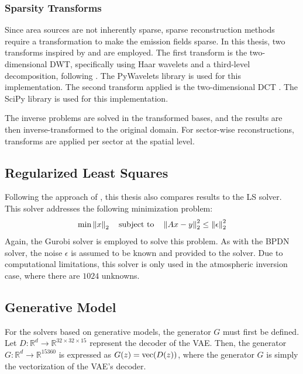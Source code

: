 \subsubsection{Sparsity Transforms}
Since area sources are not inherently sparse, sparse reconstruction methods require a transformation to make the emission fields sparse.
In this thesis, two transforms inspired by \textcite{CSUsingAI} and \textcite{UrbanSparseReconstruction} are employed.
The first transform is the two-dimensional \gls{DWT}, specifically using Haar wavelets \parencite{Wavelets} and a third-level decomposition, following \textcite{UrbanSparseReconstruction}.
The PyWavelets library \parencite{PyWavelets} is used for this implementation.
The second transform applied is the two-dimensional \gls{DCT} \parencite{DCT}.
The SciPy library \parencite{SciPy} is used for this implementation.

The inverse problems are solved in the transformed bases, and the results are then inverse-transformed to the original domain.
For sector-wise reconstructions, transforms are applied per sector at the spatial level.

\subsection{Regularized Least Squares}
Following the approach of \textcite{UrbanSparseReconstruction}, this thesis also compares results to the \gls{LS} solver.
This solver addresses the following minimization problem: 
\begin{equation}
    \min \left\lVert x\right\rVert_2 \quad \text{subject to} \quad  \left\lVert Ax -y\right\rVert_2^2 \le \left\lVert\epsilon\right\rVert_2^2
\end{equation}
Again, the Gurobi solver \parencite{Gurobi} is employed to solve this problem.
As with the \gls{BPDN} solver, the noise $\epsilon$ is assumed to be known and provided to the solver.
Due to computational limitations, this solver is only used in the atmospheric inversion case, where there are $1024$ unknowns.

\subsection{Generative Model}
For the solvers based on generative models, the generator $G$ must first be defined.
Let $D: \mathbb{R}^d \rightarrow \mathbb{R}^{32 \times 32 \times 15}$ represent the decoder of the \gls{VAE}.
Then, the generator $G: \mathbb{R}^d \rightarrow \mathbb{R}^{15360}$ is expressed as $G(z) = \text{vec}(D(z))$, where the generator $G$ is simply the vectorization of the \gls{VAE}'s decoder.

